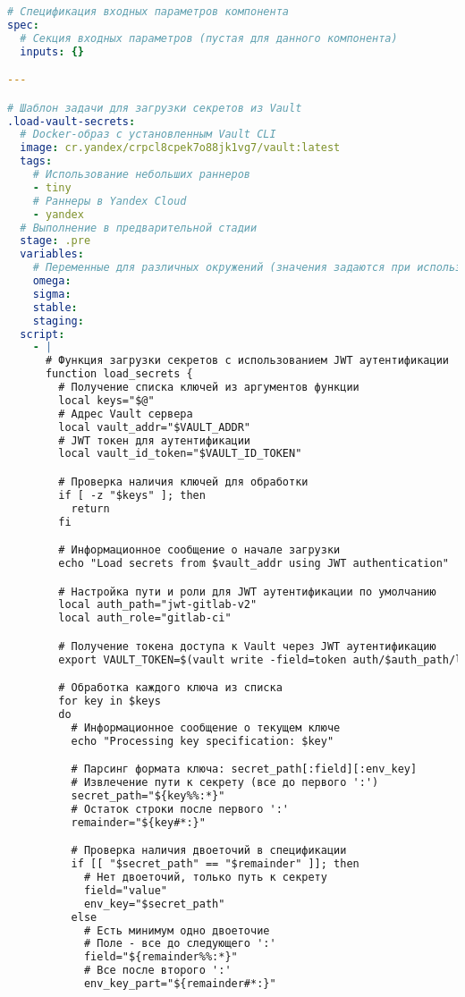 \begin{lstlisting}[language=yaml,label={lst:component-template}]
# Спецификация входных параметров компонента
spec:
  # Секция входных параметров (пустая для данного компонента)
  inputs: {}

---

# Шаблон задачи для загрузки секретов из Vault
.load-vault-secrets:
  # Docker-образ с установленным Vault CLI
  image: cr.yandex/crpcl8cpek7o88jk1vg7/vault:latest
  tags:
    # Использование небольших раннеров
    - tiny
    # Раннеры в Yandex Cloud
    - yandex
  # Выполнение в предварительной стадии
  stage: .pre
  variables:
    # Переменные для различных окружений (значения задаются при использовании)
    omega:
    sigma:
    stable:
    staging:
  script:
    - |
      # Функция загрузки секретов с использованием JWT аутентификации
      function load_secrets {
        # Получение списка ключей из аргументов функции
        local keys="$@"
        # Адрес Vault сервера
        local vault_addr="$VAULT_ADDR"
        # JWT токен для аутентификации
        local vault_id_token="$VAULT_ID_TOKEN"

        # Проверка наличия ключей для обработки
        if [ -z "$keys" ]; then
          return
        fi

        # Информационное сообщение о начале загрузки
        echo "Load secrets from $vault_addr using JWT authentication"

        # Настройка пути и роли для JWT аутентификации по умолчанию
        local auth_path="jwt-gitlab-v2"
        local auth_role="gitlab-ci"

        # Получение токена доступа к Vault через JWT аутентификацию
        export VAULT_TOKEN=$(vault write -field=token auth/$auth_path/login role=$auth_role jwt=$vault_id_token)

        # Обработка каждого ключа из списка
        for key in $keys
        do
          # Информационное сообщение о текущем ключе
          echo "Processing key specification: $key"

          # Парсинг формата ключа: secret_path[:field][:env_key]
          # Извлечение пути к секрету (все до первого ':')
          secret_path="${key%%:*}"
          # Остаток строки после первого ':'
          remainder="${key#*:}"

          # Проверка наличия двоеточий в спецификации
          if [[ "$secret_path" == "$remainder" ]]; then
            # Нет двоеточий, только путь к секрету
            field="value"
            env_key="$secret_path"
          else
            # Есть минимум одно двоеточие
            # Поле - все до следующего ':'
            field="${remainder%%:*}"
            # Все после второго ':'
            env_key_part="${remainder#*:}"


\end{lstlisting}
